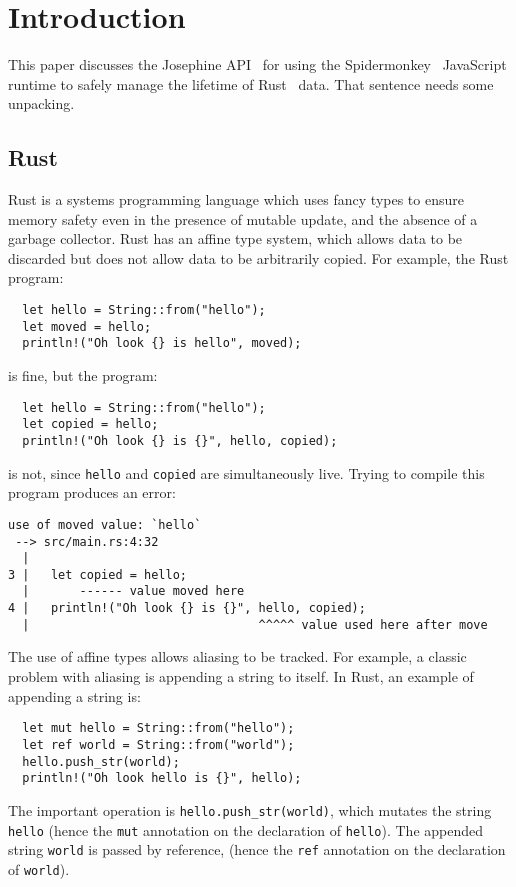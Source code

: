 \section{Introduction}

This paper discusses the Josephine API~\cite{josephine} for using
the Spidermonkey~\cite{spidermonkey} JavaScript runtime to safely
manage the lifetime of Rust~\cite{rust} data. That sentence needs
some unpacking.

\subsection{Rust}

Rust is a systems programming language which uses fancy types to
ensure memory safety even in the presence of mutable update, and the
absence of a garbage collector. Rust has an affine type system, which
allows data to be discarded but does not allow data to be arbitrarily
copied. For example, the Rust program:
\begin{verbatim}
  let hello = String::from("hello");
  let moved = hello;
  println!("Oh look {} is hello", moved);
\end{verbatim}
is fine, but the program:
\begin{verbatim}
  let hello = String::from("hello");
  let copied = hello;
  println!("Oh look {} is {}", hello, copied);
\end{verbatim}
is not, since \verb|hello| and \verb|copied| are simultaneously live. Trying to compile
this program produces an error:
\begin{verbatim}
use of moved value: `hello`
 --> src/main.rs:4:32
  |
3 |   let copied = hello;
  |       ------ value moved here
4 |   println!("Oh look {} is {}", hello, copied);
  |                                ^^^^^ value used here after move
\end{verbatim}
The use of affine types allows aliasing to be tracked. For example, a
classic problem with aliasing is appending a string to itself. In
Rust, an example of appending a string is:
\begin{verbatim}
  let mut hello = String::from("hello");
  let ref world = String::from("world");
  hello.push_str(world);
  println!("Oh look hello is {}", hello);
\end{verbatim}
The important operation is \verb|hello.push_str(world)|, which mutates the
string \verb|hello| (hence the \verb|mut| annotation on the declaration of \verb|hello|).
The appended string \verb|world| is passed by reference,
(hence the \verb|ref| annotation on the declaration of \verb|world|).

